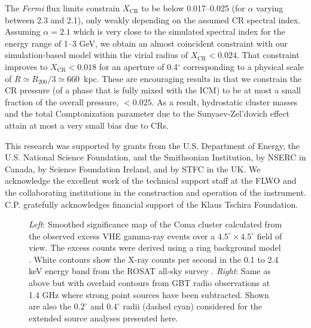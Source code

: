 \documentclass[12pt,manuscript]{aastex}
\newcommand{\CR}{\mathrm{CR}}
\begin{document}
The {\em Fermi} flux limits constrain $X_\CR$ to be below 0.017--0.025 (for $\alpha$ varying
between 2.3 and 2.1), only weakly depending on the assumed CR spectral index. Assuming $\alpha=2.1$
which is very close to the simulated spectral index for the energy range of 1--3 GeV, we obtain an
almost coincident constraint with our simulation-based model within the virial radius of
$X_\CR<0.024$. That constraint improves to $X_{\CR}<0.018$ for an aperture of 0.4$^\circ$
corresponding to a physical scale of $R \simeq R_{200}/3 \simeq 660$~kpc. These are encouraging
results in that we constrain the CR pressure (of a phase that is fully mixed with the ICM) to be at
most a small fraction of the overall pressure, $<0.025$. As a result, hydrostatic cluster masses
and the total Comptonization parameter due to the Sunyaev-Zel'dovich effect attain at most a very
small bias due to CRs.

\acknowledgments
This research was supported by grants from the U.S. Department of Energy, the U.S. National Science
Foundation, and the Smithsonian Institution, by NSERC in Canada, by Science Foundation Ireland, and
by STFC in the UK. We acknowledge the excellent work of the technical support staff at the FLWO and
the collaborating institutions in the construction and operation of the instrument. C.P. gratefully
acknowledges financial support of the Klaus Tschira Foundation.





\begin{figure*}
\begin{center}
\end{center}
\caption{\emph{Left}: Smoothed significance map of the Coma cluster calculated from the observed
excess VHE gamma-ray events over a $4.5^{\circ}\times 4.5^{\circ}$ field of view. The excess counts
were derived using a ring background model \citep{article:Aharonian_etal:2001}. White contours show
the X-ray counts per second in the 0.1 to 2.4 keV energy band from the ROSAT all-sky survey
\citep{article:BrielHenryBohringer:1992}. \emph{Right}: Same as above but with overlaid contours
from GBT radio observations at 1.4 GHz \citep{article:BrownRudnick:2010} where strong point sources
have been subtracted. Shown are also the $0.2^{\circ}$ and $0.4^{\circ}$ radii (dashed cyan)
considered for the extended source analyses presented here.}
\label{fig:skymaps}
\end{figure*}
\end{document}
